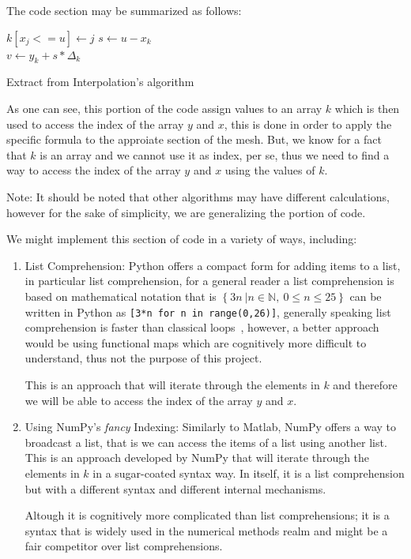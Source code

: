 The code section may be summarized as follows: 


\begin{algorithm}[H]
\SetAlgoLined
{} {
$k[x_j <= u] \gets j$
}
$s \gets u - x_k$\\
$v \gets y_k + s * \Delta_k$

\caption{Extract from Interpolation's algorithm}
\end{algorithm}
As one can see, this portion of the code assign values to an array $k$ which is then used to access the index of the array $y$ and $x$, this is done in order to apply the specific formula to the approiate section of the mesh. But, we know for a fact that $k$ is an array and we cannot use it as index, per se, thus we need to find a way to access the index of the array $y$ and $x$ using the values of $k$.

Note: It should be noted that other algorithms may have different calculations, however for the sake of simplicity, we are generalizing the portion of code.



We might implement this section of code in a variety of ways, including:
\begin{enumerate}
    \item List Comprehension: Python offers a compact form for adding items to a list, in particular list comprehension, for a general reader a list comprehension is based on mathematical notation that is $\left\{ 3n\ | n\in \mathbb{N},\ 0\leq n\leq 25\right\}$ can be written in Python as \lstinline|[3*n for n in range(0,26)]|, generally speaking list comprehension is faster than classical loops~\cite{PythonSpeedPerformanceTips}, however, a better approach would be using functional maps which are cognitively more difficult to understand, thus not the purpose of this project.
    
    This is an approach that will iterate through the elements in $k$ and therefore we will be able to access the index of the array $y$ and $x$.

    \item Using NumPy's \textit{fancy} Indexing: Similarly to Matlab, NumPy offers a way to broadcast a list, that is we can access the items of a list using another list. This is an approach developed by NumPy that will iterate through the elements in $k$ in a sugar-coated syntax way. In itself, it is a list comprehension but with a different syntax and different internal mechanisms.
    
    Altough it is cognitively more complicated than list comprehensions; it is a syntax that is widely used in the numerical methods realm and might be a fair competitor over list comprehensions.
    
    
    
\end{enumerate}
